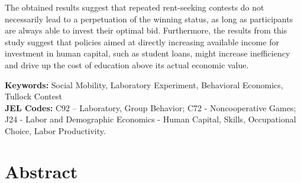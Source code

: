 \begin{small}
The obtained results suggest that repeated rent-seeking contests do not necessarily lead to a perpetuation of the winning status, as long as participants are always able to invest their optimal bid. Furthermore, the results from this study suggest that policies aimed at directly increasing available income for investment in human capital, such as student loans, might increase inefficiency and drive up the cost of education above its actual economic value.\\

\end{small}

\begin{footnotesize}

\textbf{Keywords:} Social Mobility, Laboratory Experiment, Behavioral Economics, Tullock Contest\\

\textbf{JEL Codes:} 
C92 – Laboratory, Group Behavior; C72 - Noncooperative Games;
J24 - Labor and Demographic Economics - Human Capital, Skills, Occupational Choice, Labor Productivity.

\end{footnotesize}

\chapter*{Abstract}

